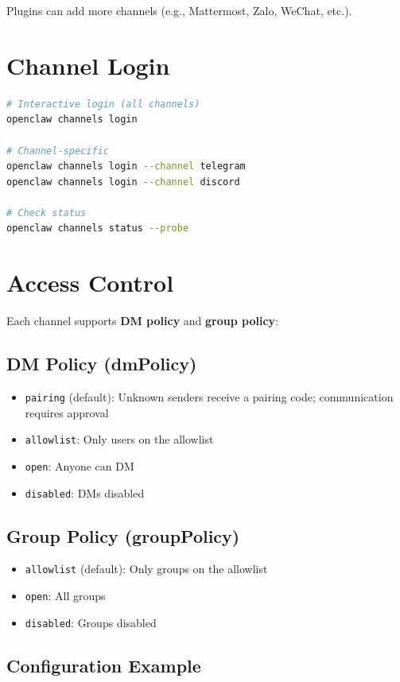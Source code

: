 Plugins can add more channels (e.g., Mattermost, Zalo, WeChat, etc.).

\section{Channel Login}

\begin{lstlisting}[language=bash]
# Interactive login (all channels)
openclaw channels login

# Channel-specific
openclaw channels login --channel telegram
openclaw channels login --channel discord

# Check status
openclaw channels status --probe
\end{lstlisting}

\section{Access Control}

Each channel supports \textbf{DM policy} and \textbf{group policy}:

\subsection{DM Policy (dmPolicy)}

\begin{itemize}
  \item \texttt{pairing} (default): Unknown senders receive a pairing code; communication requires approval
  \item \texttt{allowlist}: Only users on the allowlist
  \item \texttt{open}: Anyone can DM
  \item \texttt{disabled}: DMs disabled
\end{itemize}

\subsection{Group Policy (groupPolicy)}

\begin{itemize}
  \item \texttt{allowlist} (default): Only groups on the allowlist
  \item \texttt{open}: All groups
  \item \texttt{disabled}: Groups disabled
\end{itemize}

\subsection{Configuration Example}

